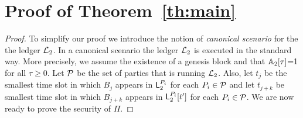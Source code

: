 \section{Proof of Theorem~\ref{th:main}}\label{se:proof}
\begin{proof}
To simplify our proof we introduce the notion of \emph{canonical scenario} for the the ledger $\mathcal{L}_2$. In a canonical scenario the ledger
$\mathcal{L}_2$ is executed in the standard way. More precisely, 
we assume the existence of a genesis block and that $\mathbb{A}_2[\tau]$=1 for all $\tau \geq 0$. Let $\mathcal{P}$ be the set of parties that is running $\mathcal{L}_2$. Also, 
let $t_j$ be the smallest time slot in which $B_j$ appears in   $\mathsf{L}_2^{P_i}$ for each $P_i\in\mathcal{P}$ and let $t_{j+k}$ be smallest time slot in which $B_{j+k}$ appears in 
$\mathsf{L}_2^{P_i}[t']$ for each $P_i\in\mathcal{P}$.
We are now ready to prove the security of $\Pi$.


\end{proof}
